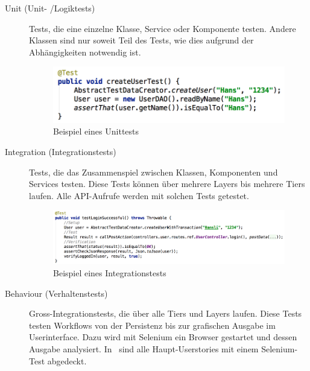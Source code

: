 			\begin{description}
				\item[Unit (Unit- /Logiktests)] Tests, die eine einzelne Klasse, 
					Service oder Komponente testen. 
					Andere Klassen sind nur soweit Teil des Tests, 
					wie dies aufgrund der Abhängigkeiten notwendig ist.
					\begin{figure}[H]
						\includegraphics[scale=0.65]{projectPlan/media/img/unitTest.png}
						\centering
						\caption{Beispiel eines Unittests}
						\label{fig:exampleUnittest}
					\end{figure}

				\item[Integration (Integrationstests)] Tests, die das Zusammenspiel zwischen Klassen, 
					Komponenten und Services testen. 
					Diese Tests können über mehrere Layers bis mehrere Tiers laufen.
					Alle API-Aufrufe werden mit solchen Tests getestet.
					\begin{figure}[H]
						\includegraphics[scale=0.65]{projectPlan/media/img/integrationTest.png}
						\centering
						\caption{Beispiel eines Integrationstests}
						\label{fig:exampleIntegrationtest}
					\end{figure}

				\item[Behaviour (Verhaltenstests)] Gross-Integrationstests, 
					die über alle Tiers und Layers laufen. 
					Diese Tests testen Workflows von der Persistenz 
					bis zur grafischen Ausgabe im Userinterface. 
					Dazu wird mit Selenium ein Browser gestartet und dessen Ausgabe analysiert.
					In \eeppi\ sind alle Haupt-Userstories mit einem Selenium-Test abgedeckt.
					

\end{description}
